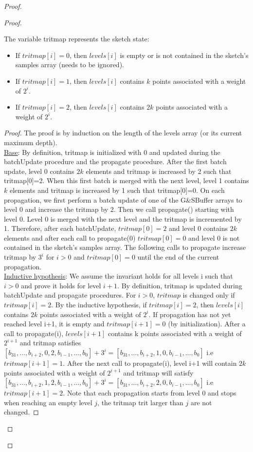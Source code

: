 \begin{proof}
\begin{proof}
\begin{invariant} \label{Inv: tritmap_sketch_state}
The variable tritmap represents the sketch state:
\begin{itemize}
    \item If \(tritmap[i] = 0\), then \(levels[i]\) is empty or is not contained in the sketch's samples array (needs to be ignored).
    \item If \(tritmap[i] = 1\), then \(levels[i]\) contains \(k\) points associated with a weight of \(2^i\).
    \item If \(tritmap[i] = 2\), then \(levels[i]\) contains \(2k\) points associated with a weight of \(2^i\).
\end{itemize}
\end{invariant}
\begin{proof}
The proof is by induction on the length of the levels array (or its current maximum depth).\\
\underline{Base}: By definition, tritmap is initialized with 0 and updated during the batchUpdate procedure and the propagate procedure.
After the first batch update, level 0 contains $2k$ elements and tritmap is increased by 2 such that tritmap[0]=2. When this first batch is merged with the next level, level 1 contains $k$ elements and tritmap is increased by 1 such that tritmap[0]=0.
On each propagation, we first perform a batch update of one of the G\&SBuffer arrays to level 0 and increase the tritmap by 2. Then we call propagate() starting with level 0. Level 0 is merged with the next level and the tritmap is incremented by 1. Therefore, after each batchUpdate, \(tritmap[0] = 2\) and level 0 contains \(2k\) elements and after each call to propagate(0) \(tritmap[0] = 0\) and level 0 is not contained in the sketch's samples array. The following calls to propagate increase tritmap by $3^i$ for $i>0$ and \(tritmap[0] = 0\) until the end of the current propagation. \\
\underline{Inductive hypothesis}: We assume the invariant holds for all levels i such that \(i>0\) and prove it holds for level \(i+1\). By definition, tritmap is updated during batchUpdate and propagate procedures. For \(i>0\), \(tritmap\) is changed only if \(tritmap[i]=2\). By the inductive hypothesis, if \(tritmap[i] = 2\), then \(levels[i]\) contains \(2k\) points associated with a weight of \(2^i\). If propagation has not yet reached level i+1, it is empty and \(tritmap[i+1]=0\) (by initialization). After a call to propagate(i), \(levels[i+1]\) contains k points associated with a weight of \(2^{i+1}\) and tritmap satisfies \([b_{31},\dots,b_{i+2},0,2,b_{i-1},\dots,b_0] + 3^i = [b_{31},\dots,b_{i+2},1,0,b_{i-1},\dots,b_0]\) i.e \(tritmap[i+1]=1\). After the next call to propagate(i), level i+1 will contain \(2k\) points associated with a weight of \(2^{i+1}\) and tritmap will satisfy \([b_{31},\dots,b_{i+2},1,2,b_{i-1},\dots,b_0] + 3^i = [b_{31},\dots,b_{i+2},2,0,b_{i-1},\dots,b_0]\) i.e \(tritmap[i+1]=2\). Note that each propagation starts from level 0 and stops when reaching an empty level $j$, the tritmap trit larger than $j$ are not changed.
\end{proof}



\end{proof}
\end{proof}
